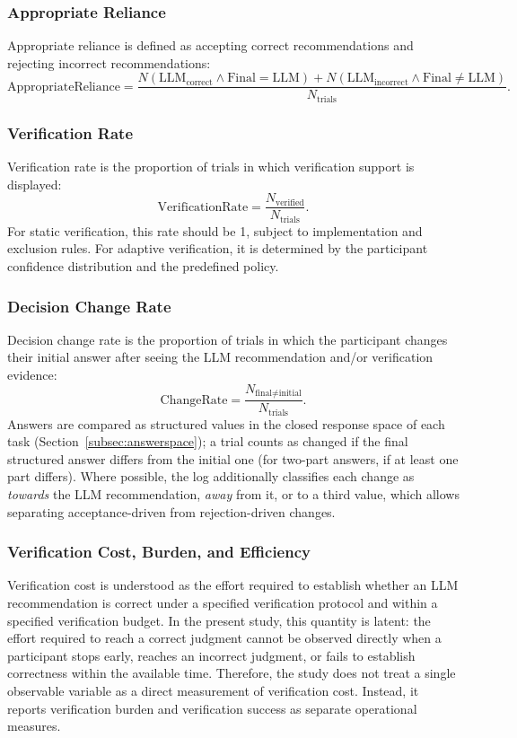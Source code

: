 \documentclass[oneside,final,14pt,a4paper]{extreport}
\theoremstyle{definition}
\theoremstyle{remark}
\begin{document}
\subsubsection{Appropriate Reliance}
Appropriate reliance is defined as accepting correct recommendations and
rejecting incorrect recommendations:
\[
\text{AppropriateReliance}
=
\frac{
N(\text{LLM}_{\text{correct}}\land\text{Final}=\text{LLM})
+
N(\text{LLM}_{\text{incorrect}}\land\text{Final}\neq\text{LLM})
}{
N_{\text{trials}}
}.
\]

\subsubsection{Verification Rate}
Verification rate is the proportion of trials in which verification support is
displayed:
\[
\text{VerificationRate}
=
\frac{N_{\text{verified}}}{N_{\text{trials}}}.
\]
For static verification, this rate should be 1, subject to
implementation and exclusion rules. For adaptive verification, it is determined
by the participant confidence distribution and the predefined policy.

\subsubsection{Decision Change Rate}
Decision change rate is the proportion of trials in which the participant
changes their initial answer after seeing the LLM recommendation and/or
verification evidence:
\[
\text{ChangeRate}
=
\frac{
N_{\text{final}\neq\text{initial}}
}{
N_{\text{trials}}
}.
\]
Answers are compared as structured values in the closed response space of
each task (Section~\ref{subsec:answerspace}); a trial counts as changed if
the final structured answer differs from the initial one (for two-part
answers, if at least one part differs). Where possible, the log
additionally classifies each change as \emph{towards} the LLM
recommendation, \emph{away} from it, or to a third value, which allows
separating acceptance-driven from rejection-driven changes.

\subsubsection{Verification Cost, Burden, and Efficiency}

Verification cost is understood as the effort required to establish whether an
LLM recommendation is correct under a specified verification protocol and
within a specified verification budget. In the present study, this quantity is
latent: the effort required to reach a correct judgment cannot be observed
directly when a participant stops early, reaches an incorrect judgment, or
fails to establish correctness within the available time. Therefore, the study
does not treat a single observable variable as a direct measurement of
verification cost. Instead, it reports verification burden and verification
success as separate operational measures.
\end{document}
